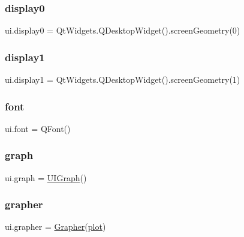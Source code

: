 \mbox{\label{namespaceui_a67d6f2ec81b00e7991565662f9e946f7}} 
\subsubsection{\texorpdfstring{display0}{display0}}
{\footnotesize\ttfamily ui.\+display0 = Qt\+Widgets.\+Q\+Desktop\+Widget().screen\+Geometry(0)}

\mbox{\label{namespaceui_afb5a8d9a573e872a43b870282effe261}} 
\subsubsection{\texorpdfstring{display1}{display1}}
{\footnotesize\ttfamily ui.\+display1 = Qt\+Widgets.\+Q\+Desktop\+Widget().screen\+Geometry(1)}

\mbox{\label{namespaceui_a30ed37eb10260adbcf97ae9f39bc5f8e}} 
\subsubsection{\texorpdfstring{font}{font}}
{\footnotesize\ttfamily ui.\+font = Q\+Font()}

\mbox{\label{namespaceui_a0b8ac4e4d4aa6108a23039c53766f6f1}} 
\subsubsection{\texorpdfstring{graph}{graph}}
{\footnotesize\ttfamily ui.\+graph = \hyperlink{classui_1_1_u_i_graph}{U\+I\+Graph}()}

\mbox{\label{namespaceui_a93ae6b16cc6a8252e4bf5a5d2ed94aa6}} 
\subsubsection{\texorpdfstring{grapher}{grapher}}
{\footnotesize\ttfamily ui.\+grapher = \hyperlink{classui_1_1_grapher}{Grapher}(\hyperlink{namespaceui_a45f8c2fae5eb64cd2de3091bd3fc3ca8}{plot})}

